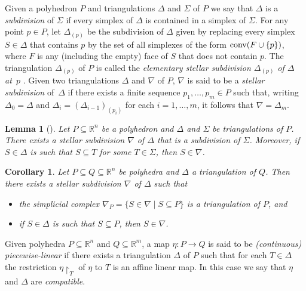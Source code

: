 \documentclass[reqno, draft]{amsart}
\newtheorem{lemma}[theorem]{Lemma}
\newtheorem{corollary}[theorem]{Corollary}
\theoremstyle{definition}
\begin{document}
Given a polyhedron $P$ and 
triangulations $\Delta$ and $\Sigma$ of $P$
we say that $\Delta$ is a {\it subdivision} of $\Sigma$ if every
simplex of $\Delta$ is contained in a simplex of $\Sigma$.
For any  point $p \in P$, let $\Delta_{(p)}$ 
be the subdivision of $\Delta$
given by replacing every simplex $S\in \Delta$ that contains $p$
by the set of all simplexes of the form $\operatorname{{\rm conv}}(F\cup\{p\})$,
where $F$ is any (including the empty) face of $S$ 
that does not contain $p$. 
The triangulation $\Delta_{(p)}$  of $P$ is called the 
{\it elementary stellar subdivision $\Delta_{(p)}$ 
of $\Delta$ at~$p$} 
\cite[ Definition III.2.1]{Ewa1996}. 
Given two triangulations $\Delta$ and $\nabla$ of $P$, 
$\nabla$ is said to be a {\it stellar subdivision} of~$\Delta$
if there exists a finite sequence $p_1,\ldots,p_m\in P$ such that, 
writing $\Delta_0=\Delta$
and $\Delta_{i}=(\Delta_{i-1})_{(p_i)}$ for each $i= 1,\ldots,m$, 
it follows that $\nabla=\Delta_m$.

 
 

\begin{lemma}[{\cite[Theorem~1]{Whi1935}}]\label{Lem:BlowUpSubdivision}
Let $P\subseteq{\mathbb{R}}^n$ be a polyhedron 
and $\Delta$ and $\Sigma$ be triangulations of $P$.
There exists a stellar subdivision $\nabla$ of $\Delta$ 
that is a subdivision of $\Sigma$. 
Moreover, if $S\in \Delta$ is such that $S\subseteq T$ 
for some $T\in\Sigma$, then $S\in\nabla$.
\end{lemma}

\begin{corollary}
\label{Cor:Triang-Subset1}
Let $P\subseteq Q\subseteq{\mathbb{R}}^{n}$ be polyhedra 
and $\Delta$ a triangulation of $Q$.
Then there exists a stellar subdivision $\nabla$ of $\Delta$   
such that 
\begin{itemize}
\item[(i)] the simplicial complex $\nabla_{P}=\{S\in\nabla\mid S\subseteq P\}$ 
is a triangulation of $P$, and 
\item[(ii)] if $S\in\Delta$ is such that $S\subseteq P$, 
then $S\in\nabla$.
\end{itemize}
\end{corollary}

Given  polyhedra $P\subseteq{\mathbb{R}}^n$  and $Q\subseteq{\mathbb{R}}^m$,
 a map $\eta\colon P \to Q$ is said to be 
{\it (continuous) piecewise-linear} 
if there exists a triangulation $\Delta$  of $P$ such that 
 for each $T\in \Delta$ 
the restriction $\eta{\upharpoonright}_T$ of $\eta$ to $T$ 
is an affine linear map. 
In this case we say that $\eta$ and $\Delta$ are {\it compatible}.
\end{document}
